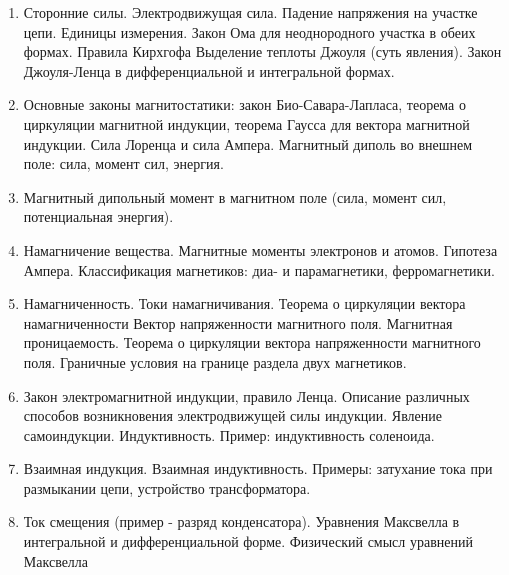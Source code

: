 \documentclass[12pt]{article}
\begin{document}
\begin{enumerate}
        \item Сторонние силы. Электродвижущая сила. Падение напряжения на участке цепи. Единицы измерения. Закон Ома для неоднородного участка в обеих формах. Правила Кирхгофа Выделение теплоты Джоуля (суть явления). Закон Джоуля-Ленца в дифференциальной и интегральной формах.
        \item Основные законы магнитостатики: закон Био-Савара-Лапласа, теорема о циркуляции магнитной индукции, теорема Гаусса для вектора магнитной индукции. Сила Лоренца и сила Ампера. Магнитный диполь во внешнем поле: сила, момент сил, энергия.
        \item Магнитный дипольный момент в магнитном поле (сила, момент сил, потенциальная энергия).
        \item Намагничение вещества. Магнитные моменты электронов и атомов. Гипотеза Ампера. Классификация магнетиков: диа- и парамагнетики, ферромагнетики.
        \item Намагниченность. Токи намагничивания. Теорема о циркуляции вектора намагниченности Вектор напряженности магнитного поля. Магнитная проницаемость. Теорема о циркуляции вектора напряженности магнитного поля. Граничные условия на границе раздела двух магнетиков.
        \item Закон электромагнитной индукции, правило Ленца. Описание различных способов возникновения электродвижущей силы индукции. Явление самоиндукции. Индуктивность. Пример: индуктивность соленоида.
        \item Взаимная индукция. Взаимная индуктивность. Примеры: затухание тока при размыкании цепи, устройство трансформатора.
        \item Ток смещения (пример - разряд конденсатора). Уравнения Максвелла в интегральной и дифференциальной форме. Физический смысл уравнений Максвелла
    \end{enumerate}
\end{document}
